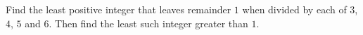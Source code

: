 Find the least positive integer that leaves remainder $1$ when divided by each of $3$, $4$, $5$ and $6$. Then find the least such integer greater than $1$.
